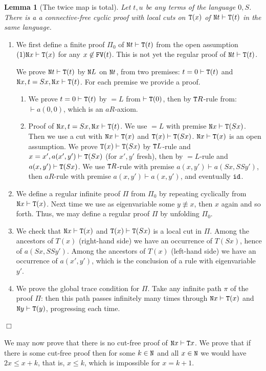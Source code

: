 \documentclass[a4paper,12pt]{article}
\newtheorem{lemma}[theorem]{Lemma}
\newenvironment{proof}[1][Proof]{\begin{trivlist}
\item[\hskip \labelsep {\bfseries #1}]}{\end{trivlist}}
\newcommand{\Nat}               { {\tt N}  }
\newcommand{\FV}              { {\tt FV} }
\newcommand{\id}              { {\tt id} }
\newcommand{\Tot}           { {\tt T} }
\newcommand{\eqL}     {= \! \!  \!  L}
\begin{document}
\begin{lemma}[The twice map is total]
\label{lemma-twice-total}
Let $t,u$ be any terms of the language $0,S$. 
There is a a connective-free cyclic proof with \emph{local} cuts on $\Tot(x)$ of $\Nat t \vdash \Tot(t)$ in the same language.
\end{lemma}


\begin{proof}
\begin{enumerate}
\item
We first define a finite proof $\Pi_0$ of $\Nat t \vdash \Tot(t)$ from the open assumption $(1) \Nat x \vdash \Tot(x)$ for any $x \not \in \FV(t)$. This is not yet the regular proof of $\Nat t \vdash \Tot(t)$.

We prove $\Nat t \vdash \Tot(t)$ by $\Nat L$ on $\Nat t$, from two premises: $t=0 \vdash \Tot(t)$ and $\Nat x, t=Sx, \Nat x \vdash \Tot(t)$. For each premise we provide a proof. 

\begin{enumerate}
\item
We prove $t=0 \vdash \Tot(t)$ by $\eqL$ from $\vdash \Tot(0)$, then by $\Tot R$-rule from: $\vdash a(0,0)$, which is an $a R$-axiom.

\item
Proof of $\Nat x, t=Sx, \Nat x \vdash \Tot(t)$. We use $\eqL$ with premise $\Nat x \vdash \Tot(Sx)$. Then we use a cut with $\Nat x \vdash \Tot(x)$ and $\Tot(x) \vdash \Tot(Sx)$.  $\Nat x \vdash \Tot(x)$ is an open assumption. We prove $\Tot(x) \vdash \Tot(Sx)$ by $\Tot L$-rule and $x=x', a(x',y') \vdash \Tot(Sx)$ (for $x',y'$ fresh), then by $\eqL$-rule and $a(x,y') \vdash \Tot(Sx)$.  We use $\Tot R$-rule with premise $a(x,y') \vdash a(Sx, SSy')$, then $a R$-rule with premise $a(x,y') \vdash a(x, y')$, and eventually $\id$.
\end{enumerate}
\item
We define a regular infinite proof $\Pi$ from $\Pi_0$ by repeating cyclically from  $\Nat x \vdash \Tot(x)$. Next time we use as eigenvariable some $y \not \equiv x$, then $x$ again and so forth. Thus, we may define a regular proof $\Pi$ by unfolding $\Pi_0$.
\item
We check that $\Nat x \vdash \Tot(x)$ and $\Tot(x) \vdash \Tot(Sx)$ is a local cut in $\Pi$. Among the ancestors of $T(x)$ (right-hand side) we have an occurrence of $T(Sx)$, hence of $a(Sx, SSy')$. Among the ancestors of  $T(x)$ (left-hand side) we have an occurrence of $a(x', y')$, which is the conclusion of a rule with eigenvariable $y'$.  
\item
We prove the global trace condition for $\Pi$. Take any infinite path $\pi$ of the proof $\Pi$: then this path passes infinitely many times through  $\Nat x \vdash \Tot(x)$ and  $\Nat y \vdash \Tot(y)$, progressing each time.
\end{enumerate}
$\Box$ \end{proof}
We may now prove that there is no cut-free proof of $\Nat x \vdash \Tot x$. We prove that if there is some cut-free proof then for some $k \in \Nat$ and all $x \in \Nat$ we would have $2x \le x+k$, that is, $x \le k$, which is impossible for $x=k+1$.
\end{document}

